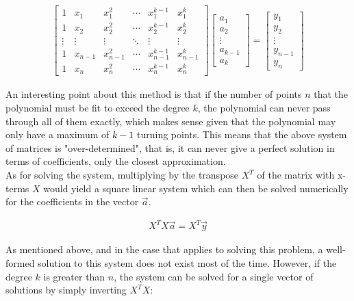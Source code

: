 \documentclass[12pt, a4paper]{article}
\begin{document}
\begin{align*}
    \begin{bmatrix}
        1      & x_1     & x_1^2     & \cdots & x_1^{k-1}     & x_1^k     \\
        1      & x_2     & x_2^2     & \cdots & x_2^{k-1}     & x_2^k     \\
        \vdots & \vdots  & \vdots    & \ddots & \vdots        & \vdots    \\
        1      & x_{n-1} & x_{n-1}^2 & \cdots & x_{n-1}^{k-1} & x_{n-1}^k \\
        1      & x_n     & x_n^2     & \cdots & x_n^{k-1}     & x_n^k
    \end{bmatrix}
    \begin{bmatrix}
        a_1 \\ a_2 \\ \vdots \\ a_{k-1} \\ a_k
    \end{bmatrix}
    =
    \begin{bmatrix}
        y_1 \\ y_2 \\ \vdots \\ y_{n-1} \\ y_n
    \end{bmatrix}
\end{align*}

An interesting point about this method is that if the number of points $n$ that
the polynomial must be fit to exceed the degree $k$, the polynomial can never
pass through all of them exactly, which makes sense given that the polynomial
may only have a maximum of $k-1$ turning points. This means that the above
system of matrices is "over-determined", that is, it can never give a perfect
solution in terms of coefficients, only the closest approximation. \\

As for solving the system, multiplying by the transpose $X^T$ of the matrix with
x-terms $X$ would yield a square linear system which can then be solved
numerically for the coefficients in the vector $\vec{a}$.

\begin{align*}
    X^TX\vec{a}=X^T\vec{y}
\end{align*}

As mentioned above, and in the case that applies to solving this problem, a
well-formed solution to this system does not exist most of the time. However, if
the degree $k$ is greater than $n$, the system can be solved for a single vector
of solutions by simply inverting $X^TX$:
\end{document}
